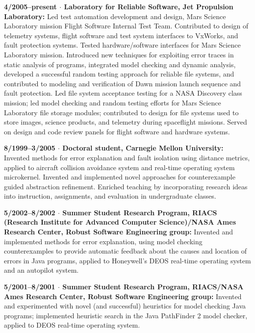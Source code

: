 \documentclass[ComputerScience]{vita}
\begin{document}
\begin{vita}
\begin{Experience}
  \item {\bf 4/2005--present $\cdot$ Laboratory for Reliable Software,
  Jet Propulsion Laboratory:} Led test automation development and
  design, Mars Science Laboratory mission Flight Software Internal
  Test Team.  Contributed to design of telemetry systems, flight
  software and test system interfaces to VxWorks, and fault protection
  systems.  Tested hardware/software interfaces for Mars Science
  Laboratory mission.  Introduced new techniques for exploiting error
  traces in static analysis of programs, integrated model checking and
  dynamic analysis, developed a successful random testing approach for
  reliable file systems, and contributed to modeling and verification
  of Dawn mission launch sequence and fault protection.  Led file
  system acceptance testing for a NASA Discovery class mission; led
  model checking and random testing efforts for Mars Science
  Laboratory file storage modules; contributed to design for file
  systems used to store images, science products, and telemetry during
  spaceflight missions.  Served on design and code review panels for
  flight software and hardware systems.

  \item {\bf 8/1999--3/2005 $\cdot$ Doctoral student, Carnegie Mellon
  University:} Invented methods for error explanation and fault
  isolation using distance metrics, applied to aircraft collision
  avoidance system and real-time operating system microkernel.  Invented
  and implemented novel approaches for counterexample guided
  abstraction refinement.  Enriched teaching by incorporating research
  ideas into instruction, assignments, and evaluation in undergraduate
  classes.

  \item {\bf 5/2002--8/2002 $\cdot$ Summer Student Research Program,
  RIACS (Research Institute for Advanced Computer Science)/NASA Ames
  Research Center, Robust Software Engineering group:} Invented and
  implemented methods for error explanation, using model checking
  counterexamples to provide automatic feedback about the causes and
  location of errors in Java programs, applied to Honeywell's DEOS
  real-time operating system and an autopilot system.

  \item {\bf 5/2001--8/2001 $\cdot$ Summer Student Research Program,
  RIACS/NASA Ames Research Center, Robust Software Engineering group:}
  Invented and experimented with novel (and successful) heuristics for
  model checking Java programs; implemented heuristic search in the
  Java PathFinder 2 model checker, applied to DEOS real-time operating
  system.


\end{Experience}
\end{vita}
\end{document}
